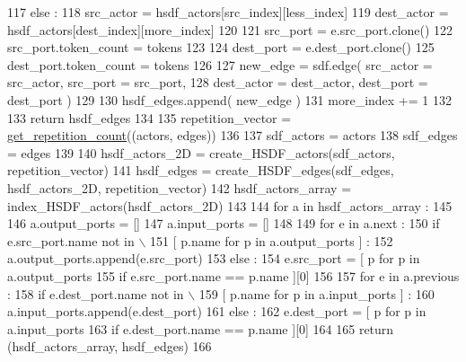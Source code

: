 \begin{DoxyCode}
117           \textcolor{keywordflow}{else} :
118             src\_actor = hsdf\_actors[src\_index][less\_index]
119             dest\_actor = hsdf\_actors[dest\_index][more\_index]
120 
121           src\_port = e.src\_port.clone()
122           src\_port.token\_count = tokens
123 
124           dest\_port = e.dest\_port.clone()
125           dest\_port.token\_count = tokens
126 
127           new\_edge = sdf.edge( src\_actor = src\_actor, src\_port = src\_port,
128                            dest\_actor = dest\_actor, dest\_port = dest\_port )
129 
130           hsdf\_edges.append( new\_edge )
131           more\_index += 1
132 
133     \textcolor{keywordflow}{return} hsdf\_edges
134 
135   repetition\_vector = \hyperlink{namespacesylva_1_1base_1_1sdf__to__hsdf_a9c5d04cd8f0b409b56239871067f50d5}{get\_repetition\_count}((actors, edges))
136 
137   sdf\_actors = actors
138   sdf\_edges = edges
139 
140   hsdf\_actors\_2D = create\_HSDF\_actors(sdf\_actors, repetition\_vector)
141   hsdf\_edges = create\_HSDF\_edges(sdf\_edges, hsdf\_actors\_2D, repetition\_vector)
142   hsdf\_actors\_array = index\_HSDF\_actors(hsdf\_actors\_2D)
143 
144   \textcolor{keywordflow}{for} a \textcolor{keywordflow}{in} hsdf\_actors\_array :
145 
146     a.output\_ports = []
147     a.input\_ports = []
148 
149     \textcolor{keywordflow}{for} e \textcolor{keywordflow}{in} a.next :
150       \textcolor{keywordflow}{if} e.src\_port.name \textcolor{keywordflow}{not} \textcolor{keywordflow}{in} \(\backslash\)
151       [ p.name \textcolor{keywordflow}{for} p \textcolor{keywordflow}{in} a.output\_ports ] :
152         a.output\_ports.append(e.src\_port)
153       \textcolor{keywordflow}{else} :
154         e.src\_port = [ p \textcolor{keywordflow}{for} p \textcolor{keywordflow}{in} a.output\_ports
155                        \textcolor{keywordflow}{if} e.src\_port.name == p.name ][0]
156 
157     \textcolor{keywordflow}{for} e \textcolor{keywordflow}{in} a.previous :
158       \textcolor{keywordflow}{if} e.dest\_port.name \textcolor{keywordflow}{not} \textcolor{keywordflow}{in} \(\backslash\)
159       [ p.name \textcolor{keywordflow}{for} p \textcolor{keywordflow}{in} a.input\_ports ] :
160         a.input\_ports.append(e.dest\_port)
161       \textcolor{keywordflow}{else} :
162         e.dest\_port = [ p \textcolor{keywordflow}{for} p \textcolor{keywordflow}{in} a.input\_ports
163                        \textcolor{keywordflow}{if} e.dest\_port.name == p.name ][0]
164 
165   \textcolor{keywordflow}{return} (hsdf\_actors\_array, hsdf\_edges)
166 
\end{DoxyCode}



